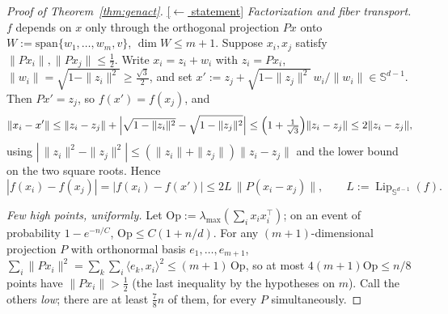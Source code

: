 \documentclass[11pt,reqno]{amsart}
\theoremstyle{plain}
\theoremstyle{definition}
\theoremstyle{remark}
\newcommand{\Sd}{\mathbb{S}^{d-1}}
\newcommand{\Lip}{\operatorname{Lip}}
\newcommand{\inn}[2]{\langle #1,#2\rangle}
\newcommand{\stmtbutton}[1]{\hyperref[#1]{\textnormal{\footnotesize\textsf{[$\leftarrow$ statement]}}}}
\begin{document}
\begin{proof}[Proof of Theorem~\textup{\ref{thm:genact}}]\label{proof:genact}\stmtbutton{thm:genact}
\emph{Factorization and fiber transport.} $f$ depends on $x$ only through the orthogonal projection $Px$ onto $W:=\mathrm{span}\{w_1,\dots,w_m,v\}$, $\dim W\le m+1$. Suppose $x_i,x_j$ satisfy $\|Px_i\|,\|Px_j\|\le\tfrac12$. Write $x_i=z_i+w_i$ with $z_i=Px_i$, $\|w_i\|=\sqrt{1-\|z_i\|^2}\ge\tfrac{\sqrt3}2$, and set $x':=z_j+\sqrt{1-\|z_j\|^2}\,w_i/\|w_i\|\in\Sd$. Then $Px'=z_j$, so $f(x')=f(x_j)$, and
\[
\|x_i-x'\|\le\|z_i-z_j\|+\Bigl|\sqrt{1-\|z_i\|^2}-\sqrt{1-\|z_j\|^2}\Bigr|\le\Bigl(1+\tfrac1{\sqrt3}\Bigr)\|z_i-z_j\|\le2\|z_i-z_j\|,
\]
using $|\,\|z_i\|^2-\|z_j\|^2|\le(\|z_i\|+\|z_j\|)\|z_i-z_j\|$ and the lower bound on the two square roots. Hence
\begin{equation}\label{eq:fibertransport}
|f(x_i)-f(x_j)|=|f(x_i)-f(x')|\le2L\,\|P(x_i-x_j)\|,\qquad L:=\Lip_{\Sd}(f).
\end{equation}

\emph{Few high points, uniformly.} Let $\mathrm{Op}:=\lambda_{\max}(\sum_ix_ix_i^\top)$; on an event of probability $1-e^{-n/C}$, $\mathrm{Op}\le C(1+n/d)$. For any $(m{+}1)$-dimensional projection $P$ with orthonormal basis $e_1,\dots,e_{m+1}$, $\sum_i\|Px_i\|^2=\sum_k\sum_i\inn{e_k}{x_i}^2\le(m+1)\,\mathrm{Op}$, so at most $4(m+1)\mathrm{Op}\le n/8$ points have $\|Px_i\|>\tfrac12$ (the last inequality by the hypotheses on $m$). Call the others \emph{low}; there are at least $\tfrac78n$ of them, for every $P$ simultaneously.


\end{proof}
\end{document}
